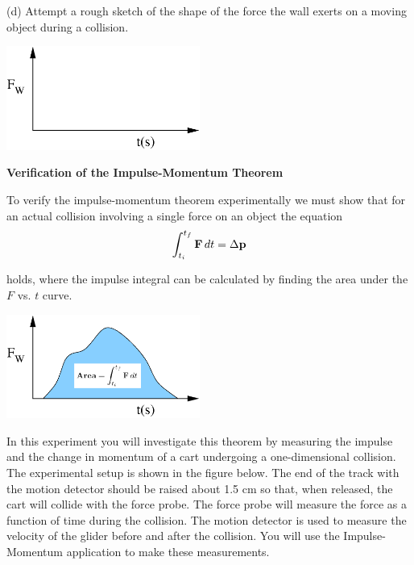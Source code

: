 (d) Attempt a rough sketch of the shape of the force the wall exerts on a moving
object during a collision.

\vspace{0.3cm}
{\par\centering \includegraphics[width=2.5in]{impulseFor132/fig2.eps} \par}
\vspace{0.3cm}

\textbf{Verification of the Impulse-Momentum Theorem} 

To verify the impulse-momentum theorem experimentally we must show that for
an actual collision involving a single force on an object the equation
\[
\int_{t_{i}}^{t_{f}}{\bf F}\,dt=\Delta {\bf p}\]


holds, where the impulse integral can be calculated by finding the area under
the  $F$ vs. $t$ curve.

\vspace{0.3cm}
{\par\centering \includegraphics[width=2.5in]{impulseFor132/fig3.eps} \par}
\vspace{0.3cm}

In this experiment you will investigate this theorem by measuring the impulse
and the change in momentum of a cart undergoing a one-dimensional collision.
The experimental setup is shown in the figure below. The end of the track with
the motion detector should be raised about 1.5 cm so that, when released, the
cart will collide with the force probe. The force probe will measure the force
as a function of time during the collision. The motion detector is used to measure
the velocity of the glider before and after the collision. You will use the
Impulse-Momentum application to make these measurements.

